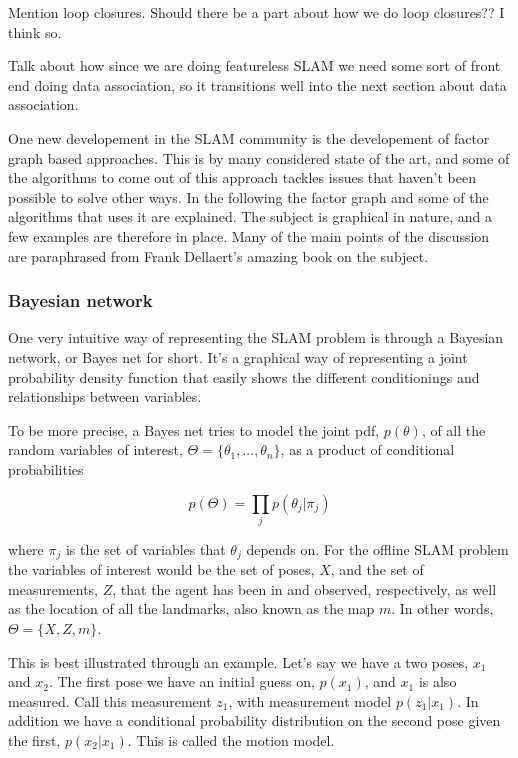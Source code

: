 Mention loop closures. Should there be a part about how we do loop closures?? I think so. 

Talk about how since we are doing featureless SLAM we need some sort of front end doing data association, so it transitions well into the next section about data association.

One new developement in the SLAM community is the developement of factor graph based approaches. This is by many considered state of the art, and some of the algorithms to come out of this approach tackles issues that haven't been possible to solve other ways. In the following the factor graph and some of the algorithms that uses it are explained. The subject is graphical in nature, and a few examples are therefore in place. Many of the main points of the discussion are paraphrased from Frank Dellaert's amazing book on the subject\cite{Dellaert}. 

\subsubsection{Bayesian network}

One very intuitive way of representing the SLAM problem is through a Bayesian network, or Bayes net for short. It's a graphical way of representing a joint probability density function that easily shows the different conditionings and relationships between variables. 

To be more precise, a Bayes net tries to model the joint pdf, $p(\theta)$, of all the random variables of interest, $\Theta = \{\theta_1, ..., \theta_n\}$, as a product of conditional probabilities

\begin{equation}
    p(\Theta) = \prod_j p(\theta_j|\pi_j)
\end{equation}

where $\pi_j$ is the set of variables that $\theta_j$ depends on. For the offline SLAM problem the variables of interest would be the set of poses, $X$, and the set of measurements, $Z$, that the agent has been in and observed, respectively, as well as the location of all the landmarks, also known as the map $m$. In other words, $\Theta = \{X,Z,m\}$. 

This is best illustrated through an example. Let's say we have a two poses, $x_1$ and $x_2$. The first pose we have an initial guess on, $p(x_1)$, and $x_1$ is also measured. Call this measurement $z_1$, with measurement model $p(z_1|x_1)$. In addition we have a conditional probability distribution on the second pose given the first, $p(x_2|x_1)$. This is called the motion model. 

